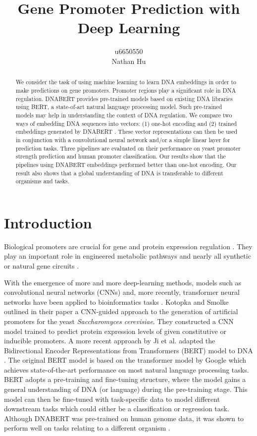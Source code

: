 \documentclass{article}
\title{Gene Promoter Prediction with Deep Learning}
\author{u6650550 \\ Nathan Hu}
\date{}
\begin{document}
\maketitle

\begin{abstract}
    We consider the task of using machine learning to learn DNA embeddings in order to make predictions on gene promoters. Promoter regions play a significant role in DNA regulation. DNABERT \cite{dnabert2020} provides pre-trained models based on existing DNA libraries using BERT, a state-of-art natural language processing model. Such pre-trained models may help in understanding the context of DNA regulation. We compare two ways of embedding DNA sequences into vectors: (1) one-hot encoding and (2) trained embeddings generated by DNABERT \cite{dnabert2020}. These vector representations can then be used in conjunction with a convolutional neural network and/or a simple linear layer for prediction tasks. Three pipelines are evaluated on their performance on yeast promoter strength prediction and human promoter classification. Our results show that the pipelines using DNABERT embeddings performed better than one-hot encoding. Our result also shows that a global understanding of DNA is transferable to different organisms and tasks.
\end{abstract}

\section{Introduction}
Biological promoters are crucial for gene and protein expression regulation \cite{smolke2020promoter}. They play an important role in engineered metabolic pathways and nearly all synthetic or natural gene circuits \cite{smolke2020promoter, Redden2015, blazeck2012}. 

With the emergence of more and more deep-learning methods, models such as convolutional neural networks (CNNs) \cite{smolke2020promoter} and, more recently, transformer neural networks \cite{vaswani2017attention,devlin2019bert} have been applied to bioinformatics tasks \cite{dnabert2020}. Kotopka and Smolke \cite{smolke2020promoter} outlined in their paper a CNN-guided approach to the generation of artificial promoters for the yeast \textit{Saccharomyces cerevisiae}. They constructed a CNN model trained to predict protein expression levels of given constitutive or inducible promoters. A more recent approach by Ji et al. adapted the Bidirectional Encoder Representations from Transformers (BERT) model to DNA \cite{dnabert2020}. The original BERT model is based on the transformer model by Google \cite{vaswani2017attention} which achieves state-of-the-art performance on most natural language processing tasks. BERT adopts a pre-training and fine-tuning structure, where the model gains a general understanding of DNA (or language) during the pre-training stage. This model can then be fine-tuned with task-specific data to model different downstream tasks which could either be a classification or regression task. Although DNABERT was pre-trained on human genome data, it was shown to perform well on tasks relating to a different organism \cite{dnabert2020}.
\end{document}
